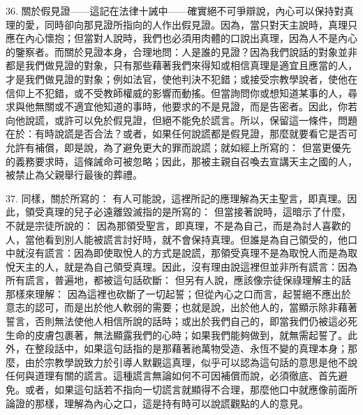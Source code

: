 36. 關於假見證——這記在法律十誡中——確實絕不可爭辯說，內心可以保持對真理的愛，同時卻向那見證所指向的人作出假見證。因為，當只對天主說時，真理只應在內心懷抱；但當對人說時，我們也必須用肉體的口說出真理，因為人不是內心的鑒察者。而關於見證本身，合理地問：人是誰的見證？因為我們說話的對象並非都是我們做見證的對象，只有那些藉著我們來得知或相信真理是適宜且應當的人，才是我們做見證的對象；例如法官，使他判決不犯錯；或接受宗教學說者，使他在信仰上不犯錯，或不受教師權威的影響而動搖。但當詢問你或想知道某事的人，尋求與他無關或不適宜他知道的事時，他要求的不是見證，而是告密者。因此，你若向他說謊，或許可以免於假見證，但絕不能免於謊言。所以，保留這一條件，問題在於：有時說謊是否合法？或者，如果任何說謊都是假見證，那麼就要看它是否可允許有補償，即是說，為了避免更大的罪而說謊；就如經上所寫的： 但當更優先的義務要求時，這條誡命可被忽略；因此，那被主親自召喚去宣講天主之國的人，被禁止為父親舉行最後的葬禮。\par

37. 同樣，關於所寫的： 有人可能說，這裡所記的應理解為天主聖言，即真理。因此，領受真理的兒子必遠離毀滅指的是所寫的： 但當接著說時，這暗示了什麼，不就是宗徒所說的： 因為那領受聖言，即真理，不是為自己，而是為討人喜歡的人，當他看到別人能被謊言討好時，就不會保持真理。但誰是為自己領受的，他口中就沒有謊言：因為即使取悅人的方式是說謊，那領受真理不是為取悅人而是為取悅天主的人，就是為自己領受真理。因此，沒有理由說這裡但並非所有謊言：因為所有謊言，普遍地，都被這句話砍斷： 但另有人說，應該像宗徒保祿理解主的話那樣來理解： 因為這裡也砍斷了一切起誓；但從內心之口而言，起誓絕不應出於意志的認可，而是出於他人軟弱的需要；也就是說，出於他人的，當顯示除非藉著誓言，否則無法使他人相信所說的話時；或出於我們自己的，即當我們仍被這必死生命的皮膚包裹著，無法顯露我們的心時；如果我們能夠做到，就無需起誓了。此外，在整段話中，如果這句話指的是那藉著祂萬物受造、永恆不變的真理本身；那麼，由於宗教學說致力於引導人默觀這真理，似乎可以認為這句話的意思是他不說任何與道理有關的謊言。這種謊言無論如何不可因補償而說，必須徹底、首先避免。或者，如果這句話若不指向一切謊言就顯得不合理，那麼他口中就應像前面所論證的那樣，理解為內心之口，這是持有時可以說謊觀點的人的意見。\par

